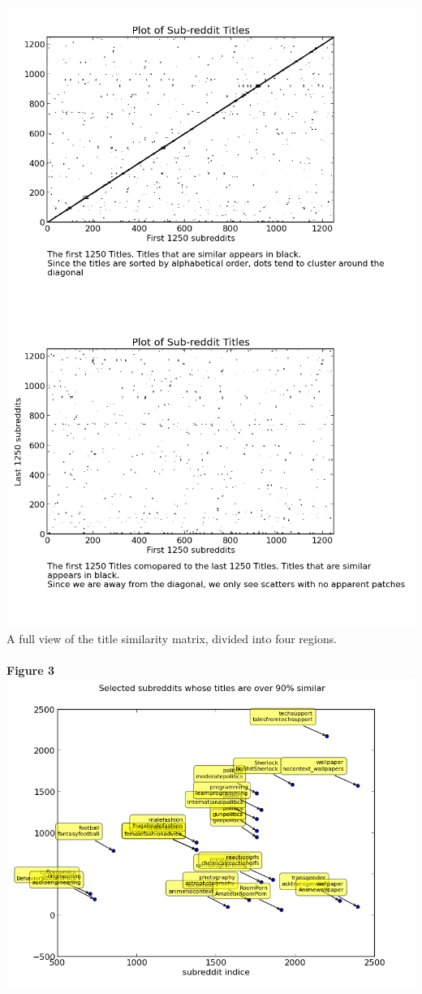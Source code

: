 \documentclass[10pt]{article}
\begin{document}
\includegraphics[scale=0.45]{Title1250.png} \includegraphics[scale=0.45]{Title12501.png}\\
A full view of the title similarity matrix, divided into four regions. \\
\pagebreak\\
\textbf{Figure 3}\\
\includegraphics[scale=0.7]{TItle90.png}\\
\end{document}
